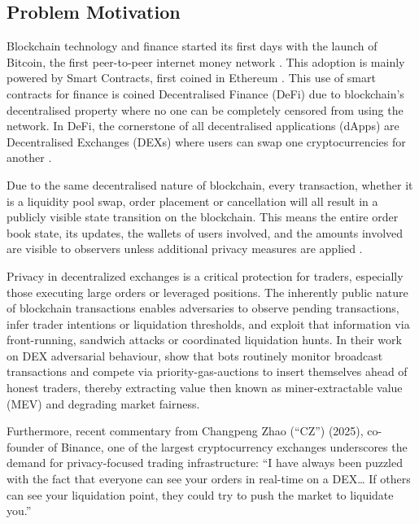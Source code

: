 \documentclass[12pt,a4paper]{article}
\begin{document}
\subsection{Problem Motivation} 
Blockchain technology and finance started its first days with the launch of Bitcoin, the first peer-to-peer internet money network \parencite{bitcoin}. This adoption is mainly powered by Smart Contracts, first coined in Ethereum \parencite{ethereum}. This use of smart contracts for finance is coined Decentralised Finance (DeFi) due to blockchain's decentralised property where no one can be completely censored from using the network. In DeFi, the cornerstone of all decentralised applications (dApps) are Decentralised Exchanges (DEXs) where users can swap one cryptocurrencies for another \parencite{lin2019deconstructing}.

Due to the same decentralised nature of blockchain, every transaction, whether it is a liquidity pool swap, order placement or cancellation will all result in a publicly visible state transition on the blockchain. This means the entire order book state, its updates, the wallets of users involved, and the amounts involved are visible to observers unless additional privacy measures are applied \parencite{schar2021decentralized}.

Privacy in decentralized exchanges is a critical protection for traders, especially those executing large orders or leveraged positions. The inherently public nature of blockchain transactions enables adversaries to observe pending transactions, infer trader intentions or liquidation thresholds, and exploit that information via front-running, sandwich attacks or coordinated liquidation hunts. In their work on DEX adversarial behaviour, \textcite{daian2019flash} show that bots routinely monitor broadcast transactions and compete via priority-gas-auctions to insert themselves ahead of honest traders, thereby extracting value then known as miner-extractable value (MEV) and degrading market fairness. 

Furthermore, recent commentary from Changpeng Zhao (“CZ”) (2025), co-founder of Binance, one of the largest cryptocurrency exchanges underscores the demand for privacy-focused trading infrastructure: “I have always been puzzled with the fact that everyone can see your orders in real-time on a DEX… If others can see your liquidation point, they could try to push the market to liquidate you.”
\end{document}
